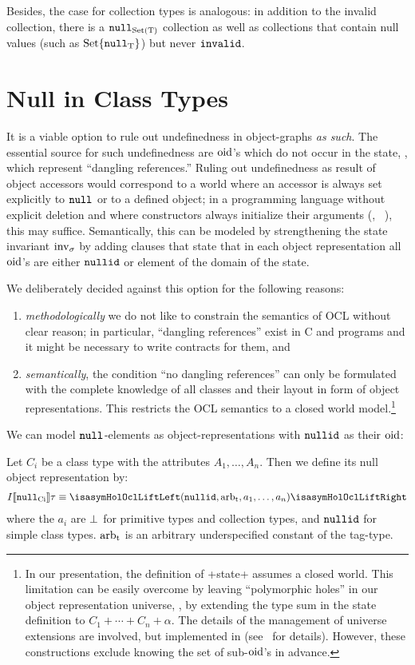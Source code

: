 Besides, the case for collection types is analogous: in addition to the invalid
collection, there is a ${\mathtt{null}_\text{{Set(T)}}}$ collection as well as collections that
contain null values (such as $\text{Set}\{{\mathtt{null}_\text{{T}}}\}$) but never
$\mathtt{invalid}$.

\section{Null in Class Types}
It is a viable option to rule out undefinedness in object-graphs \emph{as such}.
The essential source for such undefinedness are $\mathrm{oid}$'s which do not occur in
the state, \ie, which represent ``dangling references.'' Ruling out
undefinedness as result of object accessors would correspond to a world where an
accessor is always set explicitly to ${\mathtt{null}_\text{{}}}$ or to a defined object; in a
programming language without explicit deletion and where constructors always
initialize their arguments (\eg, \Specsharp~\cite{barnett.ea:spec:2004}), this
may suffice. Semantically, this can be modeled by strengthening the state
invariant $\operatorname{inv}_\sigma$ by adding clauses that state that in each object
representation all $\mathrm{oid}$'s are either $\mathtt{nullid}$ or element of the domain of the
state.

We deliberately decided against this option for the following reasons:
\begin{enumerate}
\item \emph{methodologically} we do not like to constrain the semantics of OCL
  without clear reason; in particular, ``dangling references'' exist in C and
  \Cpp{} programs and it might be necessary to write contracts for them, and
\item \emph{semantically}, the condition ``no dangling references''
  can only be formulated with the complete knowledge of all classes
  and their layout in form of object representations.  This restricts
  the OCL semantics to a closed world model.\footnote{In our
    presentation, the definition of \inlineocl+state+ assumes a closed
    world. This limitation can be easily overcome by leaving
    ``polymorphic holes'' in our object representation universe, \ie,
    by extending the type sum in the state definition to $C_1 + \cdots
    + C_n + \alpha$.  The details of the management of universe
    extensions are involved, but implemented in \holocl
    (see~\cite{brucker.ea:extensible:2008-b} for details). However,
    these constructions exclude knowing the set of sub-$\mathrm{oid}$'s in
    advance.}
\end{enumerate} We can model ${\mathtt{null}_\text{{}}}$-elements as object-representations
with $\mathtt{nullid}$ as their $\mathrm{oid}$:
\begin{definition}
  Let $C_i$ be a class type with the attributes $A_1, \ldots, A_n$. Then we
  define its null object representation by:
  \begin{gather*}
    I\semantics{\Null{Ci}}\tau \equiv \lift{(\nullid, \Tag{arb}, a_1, \ldots,
    a_n )}
  \end{gather*}
  where the $a_i$ are $\bot$ for primitive types and collection
  types, and $\mathtt{nullid}$ for simple class types. $\mathrm{arb}_{\text{t}}$ is an arbitrary
  underspecified constant of the tag-type.
\end{definition}

